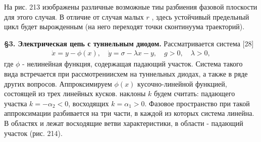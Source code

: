 \documentclass{article}
\newcommand{\RomanNumeralCaps}[1]
    {\MakeUppercase{\romannumeral #1}}
\begin{document}
На рис. 213 изображены различные возможные тиы разбиения фазовой плоскости
для этого случая. В отличие от случая \flqq малых $r$ \frqq, здесь устойчивый
предельный цикл будет вырожденным (на него переходят
точки сконтинуума траекторий).

\textbf{\S 3. Электрическая цепь с туннельным диодом.} Рассматривается
 система [28]
\begin{gather}
\dot{x}=y-\phi(x), \quad \dot{y}=\sigma - \lambda x-y, \quad g>0, \quad \lambda>0,
\tag{1}
\end{gather}
где $\phi$ - нелинейная  функция, содержащая \flqq падающий \frqq участок.
Система такого вида встречается при рассмотрениисхем на 
туннельных диодах, а также в ряде других вопросов. Аппроксимируем
$\phi(x)$ кусочно-линейной функцией, состоящей из трех линейных
кусков. наклоны $k$ будем считать: падающего участка
$k=-\alpha_{2}<0$, восходящих $k=\alpha_{1}>0$. Фазовое пространство при
такой аппроксимации разбивается на три части, в каждой из которых
система линейна. В областях \RomanNumeralCaps{1} и \RomanNumeralCaps{3} лежат восходящие
ветви характеристики, в области \RomanNumeralCaps{2} - падающий участок (рис. 214).
\end{document}
